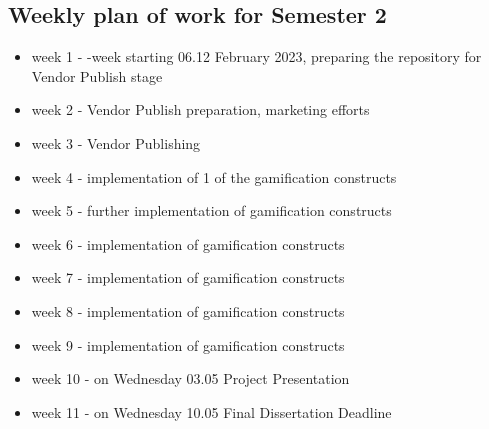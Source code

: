 \documentclass{article}
\begin{document}
\subsection*{Weekly plan of work for Semester 2}

\begin{itemize}
  \item week 1 - -week starting 06.12 February 2023, preparing the repository for Vendor Publish stage
  \item week 2 - Vendor Publish preparation, marketing efforts
  \item week 3 - Vendor Publishing
  \item week 4 - implementation of 1 of the gamification constructs
  \item week 5 - further implementation of gamification constructs
  \item week 6 - implementation of gamification constructs
  \item week 7 - implementation of gamification constructs
  \item week 8 - implementation of gamification constructs
  \item week 9 - implementation of gamification constructs
  \item week 10 - on Wednesday 03.05 Project Presentation
  \item week 11 - on Wednesday 10.05 Final Dissertation Deadline
\end{itemize}

\newpage
\end{document}
